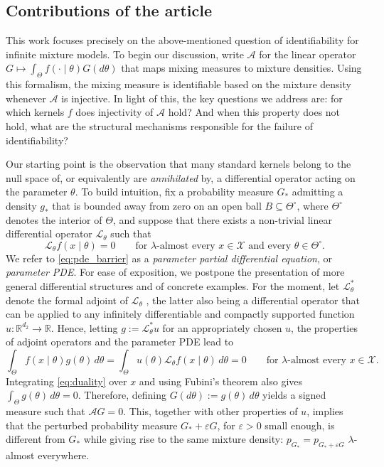 \documentclass[11pt,twoside]{article} %
\begin{document}
\subsection{Contributions of the article}\label{sec:contributions}

This work focuses precisely on the above-mentioned question of identifiability for infinite mixture models. To begin our discussion, write $\mathcal A$ for the linear operator $G\mapsto\int_\Theta f(\cdot\mid\theta)G(d\theta)$ that maps mixing measures to mixture densities. Using this formalism, the mixing measure is identifiable based on the mixture density whenever $\mathcal A$ is injective. In light of this, the key questions we address are: for which kernels $f$ does injectivity of $\mathcal A$ hold? And when this property does not hold, what are the structural mechanisms responsible for the failure of identifiability?

Our starting point is the observation that many standard kernels belong to the null space of, or equivalently are \emph{annihilated} by, a differential operator acting on the parameter $\theta$. To build intuition, fix a probability measure $G_*$ admitting a density $g_*$ that is bounded away from zero on an open ball $B\subseteq \Theta^\circ$, where $\Theta^\circ$ denotes the interior of $\Theta$, and suppose that there exists a non-trivial linear differential operator $\mathcal L_\theta$ such that
%
\begin{equation}\label{eq:pde_barrier}
    \mathcal L_\theta f(x\mid\theta)=0\qquad\text{for } \lambda\text{-almost every  }x\in\mathcal X\text{ and every }\theta\in\Theta^\circ.
\end{equation}
%
We refer to \eqref{eq:pde_barrier} as a \emph{parameter partial differential equation}, or \emph{parameter PDE}. For ease of exposition, we postpone the presentation of more general differential structures and of concrete examples. For the moment, let $\mathcal L_\theta^*$ denote the formal adjoint of $\mathcal L_\theta$ \citep{folland1999real}, the latter also being a differential operator that can be applied to any infinitely differentiable and compactly supported function $u:\mathbb R^{d_2}\to\mathbb R$. Hence, letting $g:=\mathcal L^*_\theta u$ for an appropriately chosen $u$, the properties of adjoint operators and the parameter PDE lead to
%
\begin{equation}\label{eq:duality}
    \int_\Theta f(x\mid\theta)g(\theta)\,d\theta=\int_\Theta u(\theta)\mathcal L_\theta f(x\mid\theta)\,d\theta=0\qquad \text{for }\lambda \text{-almost every } x\in\mathcal X.
\end{equation}
%
Integrating \eqref{eq:duality} over $x$ and using Fubini's theorem also gives $\int_\Theta g(\theta)\,d\theta=0$. Therefore, defining $G(d\theta):=g(\theta)\,d\theta$ yields a signed measure such that $\mathcal AG=0$. This, together with other properties of $u$, implies that the perturbed probability measure $G_*+\varepsilon G$, for $\varepsilon>0$ small enough, is different from $G_*$ while giving rise to the same mixture density: $p_{G_*}= p_{G_*+\varepsilon G}$ $\lambda$-almost everywhere.
\end{document}
